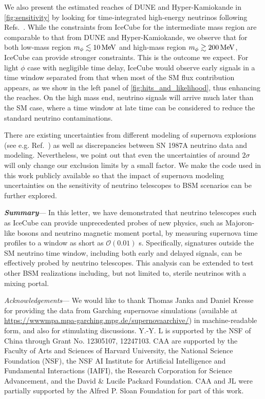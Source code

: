 \documentclass[aps,twocolumn,prl,showpacs,showkeys,preprintnumbers,superscriptaddress,nobibnotes,floatfix,longbibliography,notitlepage,nofootinbib]{revtex4-2}
\begin{document}
We also present the estimated reaches of DUNE and Hyper-Kamiokande in \cref{fig:sensitivity} by looking for time-integrated high-energy neutrinos following Refs.~\cite{Fiorillo:2022cdq, Brdar:2023tmi}.
While the constraints from IceCube for the intermediate mass region are comparable to that from DUNE and Hyper-Kamiokande, we observe that for both low-mass region $m_\phi \lesssim \unit[10]{MeV}$ and high-mass region $m_\phi \gtrsim \unit[200]{MeV}$, IceCube can provide stronger constraints.
This is the outcome we expect.
For light $\phi$ case with negligible time delay, IceCube would observe early signals in a time window separated from that when most of the SM flux contribution appears, as we show in the left panel of \cref{fig:hits_and_likelihood}, thus enhancing the reaches. On the high mass end, neutrino signals will arrive much later than the SM case, where a time window at late time can be considered to reduce the standard neutrino contaminations. 

There are existing uncertainties from different modeling of supernova explosions (see e.g. Ref.~\cite{li2023old}) as well as discrepancies between SN 1987A neutrino data and modeling. Nevertheless, we point out that even the uncertainties of around $2\sigma$  will only change our exclusion limits by a small factor.
We make the code used in this work publicly available so that the impact of supernova modeling uncertainties on the sensitivity of neutrino telescopes to BSM scenarios can be further explored.

\textbf{\textit{Summary}}---
In this letter, we have demonstrated that neutrino telescopes such as IceCube can provide unprecedented probes of new physics, such as Majoron-like bosons and neutrino magnetic moment portal, by measuring supernova time profiles to a window as short as $\mathcal{O}(0.01)$ s. Specifically, signatures outside the SM neutrino time window, including both early and delayed signals, can be effectively probed by neutrino telescopes. This analysis can be extended to test other BSM realizations including, but not limited to, sterile neutrinos with a mixing portal. 

\textit{Acknowledgements}---
We would like to thank Thomas Janka and Daniel Kresse for providing the data from Garching supernovae simulations (available at \url{https://wwwmpa.mpa-garching.mpg.de/supernovaarchive/}) in machine-readable form, and also for stimulating discussions. Y.-Y. L is supported by the NSF of China through Grant No. 12305107, 12247103.
CAA are supported by the Faculty of Arts and Sciences of Harvard University, the National Science Foundation (NSF), the NSF AI Institute for Artificial Intelligence and Fundamental Interactions (IAIFI), the Research Corporation for Science Advancement, 
and the David \& Lucile Packard Foundation.
CAA and JL were partially supported by the Alfred P. Sloan Foundation for part of this work.
\end{document}
